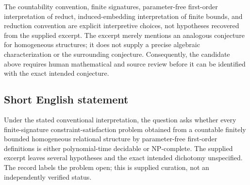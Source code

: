 \documentclass[11pt]{article}
\begin{document}
The countability convention, finite signatures, parameter-free first-order interpretation of reduct, induced-embedding interpretation of finite bounds, and reduction convention are explicit interpretive choices, not hypotheses recovered from the supplied excerpt. The excerpt merely mentions an analogous conjecture for homogeneous structures; it does not supply a precise algebraic characterization or the surrounding conjecture. Consequently, the candidate above requires human mathematical and source review before it can be identified with the exact intended conjecture.
\subsection{Short English statement}
Under the stated conventional interpretation, the question asks whether every finite-signature constraint-satisfaction problem obtained from a countable finitely bounded homogeneous relational structure by parameter-free first-order definitions is either polynomial-time decidable or \(\mathrm{NP}\)-complete. The supplied excerpt leaves several hypotheses and the exact intended dichotomy unspecified. The record labels the problem open; this is supplied curation, not an independently verified status.
\end{document}

